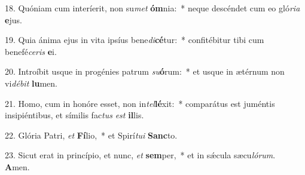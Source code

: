 18. Quóniam cum interíerit, non su\textit{met} \textbf{óm}nia:~*  neque descéndet cum eo gló\textit{ri}\textit{a} \textbf{e}jus.\

19. Quia ánima ejus in vita ipsíus bene\textit{di}\textbf{cé}tur:~*  confitébitur tibi cum benefé\textit{ce}\textit{ris} \textbf{e}i.\

20. Introíbit usque in progénies patrum \textit{su}\textbf{ó}rum:~*  et usque in ætérnum non vi\textit{dé}\textit{bit} \textbf{lu}men.\

21. Homo, cum in honóre esset, non in\textit{tel}\textbf{lé}xit:~*  comparátus est juméntis insipiéntibus, et símilis fac\textit{tus} \textit{est} \textbf{il}lis.\

22. Glória Patri, \textit{et} \textbf{Fí}lio,~*  et Spirí\textit{tu}\textit{i} \textbf{Sanc}to.\

23. Sicut erat in princípio, et nunc, \textit{et} \textbf{sem}per,~*  et in sǽcula sæcu\textit{ló}\textit{rum}. \textbf{A}men.\

